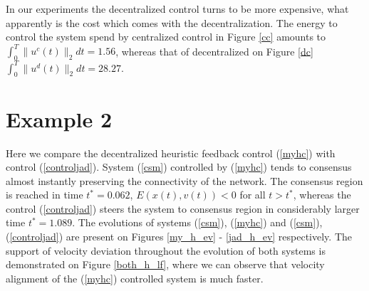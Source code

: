 \documentclass[a4paper,10pt, english]{article}
\begin{document}
In our experiments the decentralized control turns to be more expensive, what apparently is the cost which comes with the decentralization. 
The energy to control the system spend by centralized control in Figure \ref{cc} amounts to  $\int_{0}^{T} \|u^c(t)\|_2 dt  = 1.56$, whereas that of decentralized on Figure \ref{dc} $\int_{0}^{T} \|u^d(t)\|_2 dt  = 28.27$.



 \section{Example 2}
  Here we compare the decentralized heuristic feedback control (\ref{myhc}) with control (\ref{controljad}).
System (\ref{csm}) controlled by (\ref{myhc}) tends to consensus almost instantly preserving the connectivity of the network. The consensus region is reached 
  in time   $t^* = 0.062$,  $E(x(t), v(t)) < 0$ for all $t>t^{*}$, whereas the control (\ref{controljad}) steers the system to consensus region in considerably larger time  $t^* = 1.089$.
  The evolutions of systems (\ref{csm}), (\ref{myhc}) and (\ref{csm}), (\ref{controljad}) are present on Figures \ref{my_h_ev} - \ref{jad_h_ev} respectively.
  The support of velocity deviation throughout the evolution of both systems is demonstrated on Figure \ref{both_h_lf}, where we can observe that velocity alignment of the (\ref{myhc}) controlled system is much faster.
\end{document}
